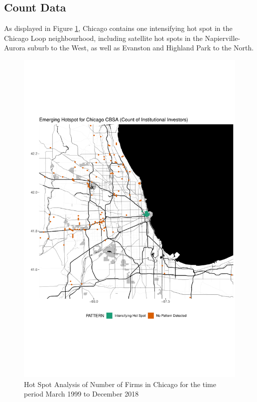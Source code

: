 \subsection{Count Data}
As displayed in Figure \ref{fig:Chicagocounthotspot}, Chicago contains one intensifying hot spot in the Chicago Loop neighbourhood, including satellite hot spots in the Napierville-Aurora suburb to the West, as well as Evanston and Highland Park to the North.  
\begin{figure}
	\centering
	\includegraphics[width=1\linewidth]{Figures/ChapterIV/Chi_Count_EH}
	\caption[Hot Spot Analysis of Number of Firms in Chicago CBSA 1999-2018]{Hot Spot Analysis of Number of Firms in Chicago for the time period March 1999 to December 2018}
	\label{fig:Chicagocounthotspot}
\end{figure}

